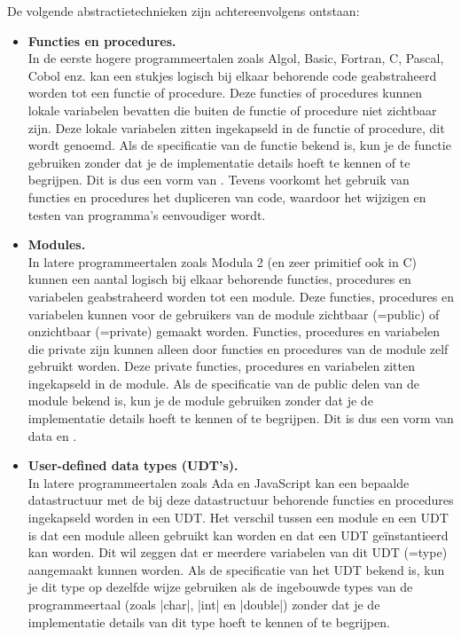 \begin{cpplstShortInline}
{
}{}
De volgende abstractietechnieken zijn achtereenvolgens ontstaan:
\begin{itemize}
    \item \textbf{Functies en procedures.}\\
In de eerste hogere programmeertalen zoals Algol, Basic, Fortran, C, Pascal, Cobol enz.
kan een stukjes logisch bij elkaar behorende code geabstraheerd worden tot een functie of procedure.
Deze functies of procedures kunnen lokale variabelen bevatten die buiten de functie of procedure niet zichtbaar zijn.
Deze lokale variabelen zitten ingekapseld in de functie of procedure, dit wordt \emph{} genoemd.
Als de specificatie van de functie bekend is, kun je de functie gebruiken zonder dat je de implementatie details hoeft te kennen of te begrijpen.
Dit is dus een vorm van .
Tevens voorkomt het gebruik van functies en procedures het dupliceren van code, waardoor het wijzigen en testen van programma's eenvoudiger wordt.
    \item \textbf{Modules.}\\
In latere programmeertalen zoals Modula 2 (en zeer primitief ook in C) kunnen een aantal logisch bij elkaar behorende functies, procedures en variabelen geabstraheerd worden tot een module.
Deze functies, procedures en variabelen kunnen voor de gebruikers van de module zichtbaar (=public) of onzichtbaar (=private) gemaakt worden.
Functies, procedures en variabelen die private zijn kunnen alleen door functies en procedures van de module zelf gebruikt worden.
Deze private functies, procedures en variabelen zitten ingekapseld in de module.
Als de specificatie van de public delen van de module bekend is, kun je de module gebruiken zonder dat je de implementatie details hoeft te kennen of te begrijpen.
Dit is dus een vorm van data en .
    \item \textbf{User-defined data types (UDT's).}\\
In latere programmeertalen zoals Ada en JavaScript kan een bepaalde datastructuur met de bij deze datastructuur behorende functies en procedures ingekapseld worden in een UDT.
Het verschil tussen een module en een UDT is dat een module alleen gebruikt kan worden en dat een UDT geïnstantieerd kan worden.
Dit wil zeggen dat er meerdere variabelen van dit UDT (=type) aangemaakt kunnen
worden.
Als de specificatie van het UDT bekend is, kun je dit type op dezelfde wijze gebruiken als de ingebouwde types van de programmeertaal (zoals |char|, |int| en |double|) zonder dat je de implementatie details van dit type hoeft te kennen of te begrijpen.

\end{itemize}
\end{cpplstShortInline}

